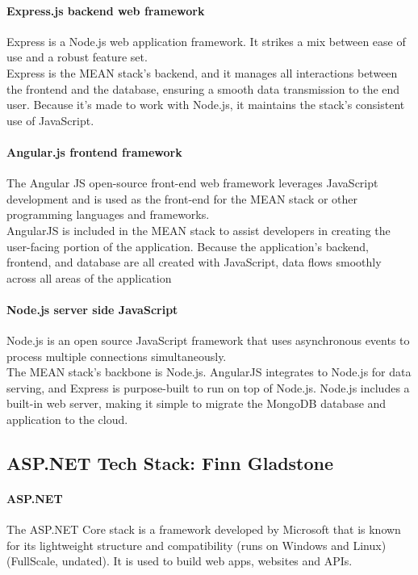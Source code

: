 \documentclass[a4paper, 11pt]{report}
\begin{document}
	\paragraph{Express.js backend web framework} Express is a Node.js web application framework. It strikes a mix between ease of use and a robust feature set.
	\\ Express is the MEAN stack's backend, and it manages all interactions between the frontend and the database, ensuring a smooth data transmission to the end user. Because it's made to work with Node.js, it maintains the stack's consistent use of JavaScript.
	
	\paragraph {Angular.js frontend framework} The Angular JS open-source front-end web framework leverages JavaScript development and is used as the front-end for the MEAN stack or other programming languages and frameworks. 
	\\AngularJS is included in the MEAN stack to assist developers in creating the user-facing portion of the application. Because the application's backend, frontend, and database are all created with JavaScript, data flows smoothly across all areas of the application
	
	\paragraph{Node.js server side JavaScript} Node.js is an open source JavaScript framework that uses asynchronous events to process multiple connections simultaneously.
	\\ The MEAN stack's backbone is Node.js. AngularJS integrates to Node.js for data serving, and Express is purpose-built to run on top of Node.js. Node.js includes a built-in web server, making it simple to migrate the MongoDB database and application to the cloud.
	
	
	\subsection{ASP.NET Tech Stack: Finn Gladstone}
	\paragraph{ASP.NET} The ASP.NET Core stack is a framework developed by Microsoft that is known for its lightweight structure and compatibility (runs on Windows and Linux) (FullScale, undated). It is used to build web apps, websites and APIs. 
	
\end{document}
